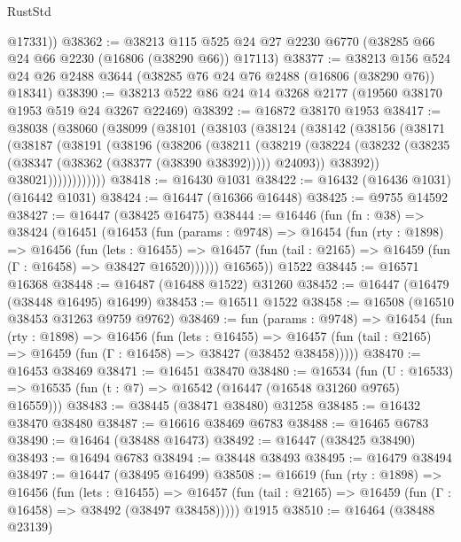 \begin{lexlean}{RustStd}
\begin{coremodule}
        @17331))
@38362 := @38213
    @115
    @525
    @24
    @27
    @2230
    @6770
    (@38285 @66 @24 @66 @2230 (@16806 (@38290 @66)) @17113)
@38377 := @38213
    @156
    @524
    @24
    @26
    @2488
    @3644
    (@38285 @76 @24 @76 @2488 (@16806 (@38290 @76)) @18341)
@38390 := @38213 @522 @86 @24 @14 @3268 @2177 (@19560 @38170 @1953 @519 @24 @3267 @22469)
@38392 := @16872 @38170 @1953
@38417 := @38038
    (@38060
      (@38099
        (@38101
          (@38103
            (@38124
              (@38142
                (@38156
                  (@38171
                    (@38187
                      (@38191
                        (@38196
                          (@38206
                            (@38211
                              (@38219
                                (@38224
                                  (@38232
                                    (@38235 (@38347 (@38362 (@38377 (@38390 @38392)))))
                                    @24093))
                                @38392))
                            @38021))))))))))))
@38418 := @16430 @1031
@38422 := @16432 (@16436 @1031) (@16442 @1031)
@38424 := @16447 (@16366 @16448)
@38425 := @9755 @14592
@38427 := @16447 (@38425 @16475)
@38444 := @16446
    (fun (fn : @38) =>
    @38424
      (@16451
        (@16453
          (fun (params : @9748) =>
          @16454
            (fun (rty : @1898) =>
            @16456
              (fun (lets : @16455) =>
              @16457 (fun (tail : @2165) => @16459 (fun (Γ : @16458) => @38427 @16520))))))
        @16565))
    @1522
@38445 := @16571 @16368
@38448 := @16487 (@16488 @1522) @31260
@38452 := @16447 (@16479 (@38448 @16495) @16499)
@38453 := @16511 @1522
@38458 := @16508 (@16510 @38453 @31263 @9759 @9762)
@38469 := fun (params : @9748) =>
  @16454
    (fun (rty : @1898) =>
    @16456
      (fun (lets : @16455) =>
      @16457 (fun (tail : @2165) => @16459 (fun (Γ : @16458) => @38427 (@38452 @38458)))))
@38470 := @16453 @38469
@38471 := @16451 @38470
@38480 := @16534
    (fun (U : @16533) => @16535 (fun (t : @7) => @16542 (@16447 (@16548 @31260 @9765) @16559)))
@38483 := @38445 (@38471 @38480) @31258
@38485 := @16432 @38470 @38480
@38487 := @16616 @38469 @6783
@38488 := @16465 @6783
@38490 := @16464 (@38488 @16473)
@38492 := @16447 (@38425 @38490)
@38493 := @16494 @6783
@38494 := @38448 @38493
@38495 := @16479 @38494
@38497 := @16447 (@38495 @16499)
@38508 := @16619
    (fun (rty : @1898) =>
    @16456
      (fun (lets : @16455) =>
      @16457 (fun (tail : @2165) => @16459 (fun (Γ : @16458) => @38492 (@38497 @38458)))))
    @1915
@38510 := @16464 (@38488 @23139)

\end{coremodule}
\end{lexlean}

